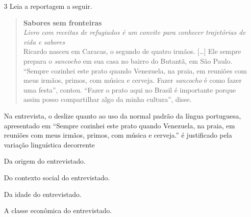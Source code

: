 \num{3} Leia a reportagem a seguir.

\begin{quote}
\centering\noindent\textbf{Sabores sem fronteiras}\\

\centering\noindent\emph{Livro com receitas de refugiados é um convite para conhecer
trajetórias de vida e sabores}\\

\noindent Ricardo nasceu em Caracas, o segundo de quatro irmãos. {[}\ldots{]} Ele
sempre prepara o \emph{sancocho} em sua casa no bairro do Butantã, em
São Paulo. ``Sempre cozinhei este prato quando Venezuela, na praia, em
reuniões com meus irmãos, primos, com música e cerveja. Fazer
\emph{sancocho} é como fazer uma festa'', contou. ``Fazer o prato aqui
no Brasil é importante porque assim posso compartilhar algo da minha
cultura'', disse.

\end{quote}

\noindent Na entrevista, o deslize quanto ao uso da normal padrão da língua
portuguesa, apresentado em ``Sempre cozinhei este prato quando
Venezuela, na praia, em reuniões com meus irmãos, primos, com música e
cerveja.'' é justificado pela variação linguística decorrente

\begin{escolha}
\item Da origem do entrevistado.
\item Do contexto social do entrevistado.
\item Da idade do entrevistado.
\item A classe econômica do entrevistado.
\end{escolha}







